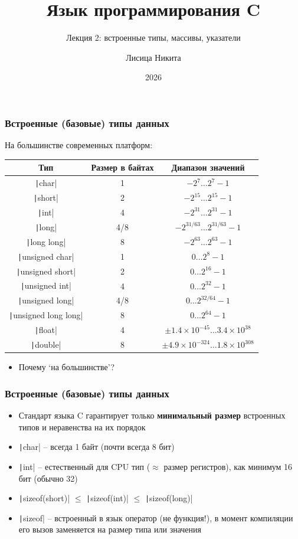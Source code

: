 \documentclass[10pt]{beamer}
\title{Язык программирования C}
\subtitle{Лекция 2: встроенные типы, массивы, указатели}
\author{Лисица Никита}
\date{2026}
\begin{document}
\frame{\titlepage}

\begin{frame}[fragile]
\frametitle{Встроенные (базовые) типы данных}
На большинстве современных платформ:
\begin{center}
  \begin{tabular}{ c c c }
    \hline
    Тип & Размер в байтах & Диапазон значений \\
    \hline
    \texttt|char| & 1 & \(-2^7\dots 2^7-1\) \\
    \texttt|short| & 2 & \(-2^{15}\dots 2^{15}-1\) \\
    \texttt|int| & 4 & \(-2^{31}\dots 2^{31}-1\) \\
    \texttt|long| & 4/8 & \(-2^{31/63}\dots 2^{31/63}-1\) \\
    \texttt|long long| & 8 & \(-2^{63}\dots 2^{63}-1\) \\
    \texttt|unsigned char| & 1 & \(0\dots 2^8-1\) \\
    \texttt|unsigned short| & 2 & \(0\dots 2^{16}-1\) \\
    \texttt|unsigned int| & 4 & \(0\dots 2^{32}-1\) \\
    \texttt|unsigned long| & 4/8 & \(0\dots 2^{32/64}-1\) \\
    \texttt|unsigned long long| & 8 & \(0\dots 2^{64}-1\) \\
    \hline
    \texttt|float| & 4 & \(\pm1.4\times 10^{-45}\dots 3.4\times 10^{38}\) \\
    \texttt|double| & 8 & \(\pm4.9\times 10^{-324}\dots 1.8\times 10^{308}\) \\
    \hline
  \end{tabular}
\end{center}
\pause
\begin{itemize}
\item Почему `на большинстве'?
\end{itemize}
\end{frame}

\begin{frame}[fragile]
\frametitle{Встроенные (базовые) типы данных}
\begin{itemize}
\item Стандарт языка C гарантирует только \textbf{минимальный размер} встроенных типов и неравенства на их порядок
\pause
\item \texttt|char| -- всегда 1 байт (почти всегда 8 бит)
\pause
\item \texttt|int| -- естественный для CPU тип (\(\approx\) размер регистров), как минимум 16 бит (обычно 32)
\pause
\item \texttt|sizeof(short)| \(\leq\) \texttt|sizeof(int)| \(\leq\) \texttt|sizeof(long)|
\pause
\item \texttt|sizeof| -- встроенный в язык оператор (не функция!), в момент компиляции его вызов заменяется на размер типа или значения
\end{itemize}
\end{frame}
\end{document}
